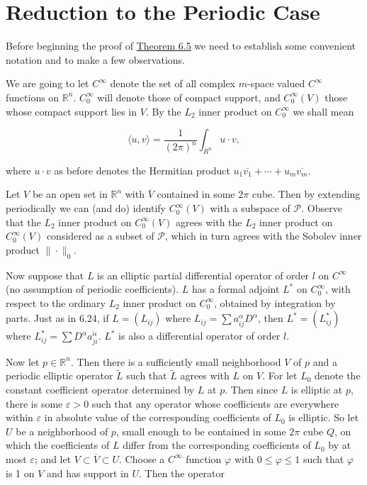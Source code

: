 \section{Reduction to the Periodic Case}


\begin{remarks}\label{thm:6.31}
Before beginning the proof of \hyperref[thm:6.5]{Theorem 6.5} we need to establish some convenient notation and to make a few observations.

We are going to let $C^{\infty}$ denote the set of all complex $m$-space valued $C^{\infty}$ functions on $\mathbb{R}^n$. $C_0^{\infty}$ will denote those of compact support, and $C_0^{\infty}(V)$ those whose compact support lies in $V$. By the $L_2$ inner product on $C_0^{\infty}$ we shall mean

\begin{equation}
\tag{1}\label{eq:6.31:1}
\langle u,v\rangle=\frac{1}{(2\pi)^{n}}\int_{R^{n}}u\cdot v,
\end{equation}

where  $ u \cdot v $ as before denotes the Hermitian product  $ u_1\overline{v_1} + \cdots + u_m\overline{v_m} $.

Let $V$ be an open set in $\mathbb{R}^n$ with $\overline{V}$ contained in some $2\pi$ cube. Then by extending periodically we can (and do) identify $C_0^\infty(V)$ with a subspace of $\mathcal{P}$. Observe that the $L_2$ inner product on $C_0^\infty(V)$ agrees with the $L_2$ inner product on $C_0^\infty(V)$ considered as a subset of $\mathcal{P}$, which in turn agrees with the Sobolev inner product $\|\cdot\|_0$.

Now suppose that $L$ is an elliptic partial differential operator of order $l$ on $C^\infty$ (no assumption of periodic coefficients). $L$ has a formal adjoint $L^*$ on $C_0^\infty$, with respect to the ordinary $L_2$ inner product on $C_0^\infty$, obtained by integration by parts. Just as in 6.24, if $L = (L_{ij})$ where $L_{ij} = \sum a_{ij}^{\alpha} D^{\alpha}$, then $L^* = (L_{ij}^*)$ where $L_{ij}^* = \sum D^{\alpha} \overline{a_{ji}^{\alpha}}$. $L^*$ is also a differential operator of order $l$.

Now let $p \in \mathbb{R}^n$. Then there is a sufficiently small neighborhood $V$ of $p$ and a periodic elliptic operator $\tilde{L}$ such that $\tilde{L}$ agrees with $L$ on $V$. For let $L_0$ denote the constant coefficient operator determined by $L$ at $p$. Then since $L$ is elliptic at $p$, there is some $\varepsilon > 0$ such that any operator whose coefficients are everywhere within $\varepsilon$ in absolute value of the corresponding coefficients of $L_0$ is elliptic. So let $U$ be a neighborhood of $p$, small enough to be contained in some $2\pi$ cube $Q$, on which the coefficients of $L$ differ from the corresponding coefficients of $L_0$ by at most $\varepsilon$; and let $V \subset \overline{V} \subset U$. Choose a $C^\infty$ function $\varphi$ with $0 \leq \varphi \leq 1$ such that $\varphi$ is 1 on $V$ and has support in $U$. Then the operator


\end{remarks}

